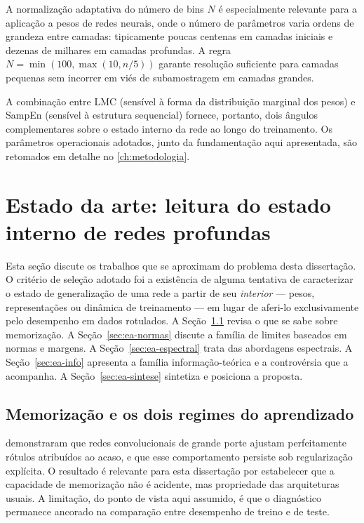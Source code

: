 A normalização adaptativa do número de bins $N$ é especialmente
relevante para a aplicação a pesos de redes neurais, onde o número
de parâmetros varia ordens de grandeza entre camadas: tipicamente
poucas centenas em camadas iniciais e dezenas de milhares em
camadas profundas. A regra $N = \min(100, \max(10, n/5))$ garante
resolução suficiente para camadas pequenas sem incorrer em viés de
subamostragem em camadas grandes.

A combinação entre LMC (sensível à forma da distribuição marginal
dos pesos) e SampEn (sensível à estrutura sequencial)
fornece, portanto, dois ângulos complementares sobre o estado
interno da rede ao longo do treinamento. Os parâmetros operacionais
adotados, junto da fundamentação aqui apresentada, são retomados em
detalhe no \autoref{ch:metodologia}.


\section{Estado da arte: leitura do estado interno de redes profundas}
\label{sec:trabalhos-relacionados}

Esta seção discute os trabalhos que se aproximam do problema desta dissertação.
O critério de seleção adotado foi a existência de alguma tentativa de
caracterizar o estado de generalização de uma rede a partir de seu
\emph{interior} --- pesos, representações ou dinâmica de treinamento --- em
lugar de aferi-lo exclusivamente pelo desempenho em dados rotulados. A
Seção~\ref{sec:ea-memorizacao} revisa o que se sabe sobre memorização. A
Seção~\ref{sec:ea-normas} discute a família de limites baseados em normas e
margens. A Seção~\ref{sec:ea-espectral} trata das abordagens espectrais. A
Seção~\ref{sec:ea-info} apresenta a família informação-teórica e a controvérsia
que a acompanha. A Seção~\ref{sec:ea-sintese} sintetiza e posiciona a proposta.

\subsection{Memorização e os dois regimes do aprendizado}
\label{sec:ea-memorizacao}

 demonstraram que redes convolucionais de grande porte
ajustam perfeitamente rótulos atribuídos ao acaso, e que esse comportamento
persiste sob regularização explícita. O resultado é relevante para esta
dissertação por estabelecer que a capacidade de memorização não é acidente, mas
propriedade das arquiteturas usuais. A limitação, do ponto de vista aqui assumido, é que o diagnóstico permanece
ancorado na comparação entre desempenho de treino e de teste.

